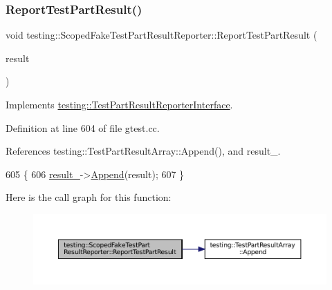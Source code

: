 \mbox{\label{classtesting_1_1ScopedFakeTestPartResultReporter_a82531434f51632d98ed7cdcdb10b8b92}} 
\subsubsection{\texorpdfstring{Report\+Test\+Part\+Result()}{ReportTestPartResult()}}
{\footnotesize\ttfamily void testing\+::\+Scoped\+Fake\+Test\+Part\+Result\+Reporter\+::\+Report\+Test\+Part\+Result (\begin{DoxyParamCaption}\item[{const \hyperlink{classtesting_1_1TestPartResult}{Test\+Part\+Result} \&}]{result }\end{DoxyParamCaption})\hspace{0.3cm}{\ttfamily [virtual]}}



Implements \hyperlink{classtesting_1_1TestPartResultReporterInterface_aa2f920e7a5a0a6d0faf19e3727928c22}{testing\+::\+Test\+Part\+Result\+Reporter\+Interface}.



Definition at line 604 of file gtest.\+cc.



References testing\+::\+Test\+Part\+Result\+Array\+::\+Append(), and result\+\_\+.


\begin{DoxyCode}
605                                   \{
606   \hyperlink{classtesting_1_1ScopedFakeTestPartResultReporter_a729a26c94e4082ee0dc3312395a3f480}{result\_}->\hyperlink{classtesting_1_1TestPartResultArray_a01844bd505b18a666324617a1b459558}{Append}(result);
607 \}
\end{DoxyCode}
Here is the call graph for this function\+:
\nopagebreak
\begin{figure}[H]
\begin{center}
\leavevmode
\includegraphics[width=350pt]{classtesting_1_1ScopedFakeTestPartResultReporter_a82531434f51632d98ed7cdcdb10b8b92_cgraph}
\end{center}
\end{figure}


